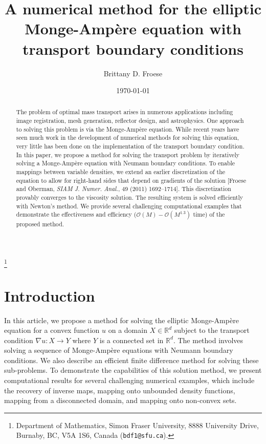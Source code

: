 \documentclass{amsart}
\theoremstyle{lemma}
\theoremstyle{remark}
\begin{document}
\title[Numerics for Monge-Amp\`ere with transport boundary conditions]{A numerical method for the elliptic Monge-Amp\`ere equation with transport boundary conditions}

\author{Brittany D. Froese
        }
        \thanks{Department of Mathematics, Simon Fraser University, 8888 University 
        Drive, Burnaby, BC, 
        V5A 1S6, Canada ({\tt bdf1@sfu.ca}).}

\begin{abstract}
The problem of optimal mass transport arises in numerous applications including image registration, mesh generation, reflector design, and astrophysics.  One approach to solving this problem is via the Monge-Amp\`ere equation.  While recent years have seen much work in the development of numerical methods for solving this equation, very little has been done on the implementation of the transport boundary condition.  In this paper, we propose a method for solving the transport problem by iteratively solving a Monge-Amp\`ere equation with Neumann boundary conditions.  To enable mappings between variable densities, we extend an earlier discretization of the equation to allow for right-hand sides that depend on gradients of the solution [Froese and Oberman, \emph{SIAM J. Numer. Anal.}, 49 (2011) 1692--1714].  This discretization provably converges to the viscosity solution.  The resulting system is solved efficiently with Newton's method.  We provide several challenging computational examples that demonstrate the effectiveness and efficiency ($\mathcal{O}(M)-\mathcal{O}(M^{1.3})$ time) of the proposed method.
\end{abstract}

\date{\today}    
\maketitle

\section{Introduction}\label{sec:intro}
In this article, we propose a method for solving the elliptic {{Monge-Amp\`ere}\xspace} equation for a convex function $u$ on a domain $X \in {\mathbb{R}}^d$ subject to the transport condition $\nabla u:X \to Y$ where $Y$ is a connected set in ${\mathbb{R}}^d$.  The method involves solving a sequence of {{Monge-Amp\`ere}\xspace} equations with Neumann boundary conditions.  We also describe an efficient finite difference method for solving these sub-problems.  To demonstrate the capabilities of this solution method, we present computational results for several challenging numerical examples, which include the recovery of inverse maps, mapping onto unbounded density functions, mapping from a disconnected domain, and mapping onto non-convex sets.
\end{document}
